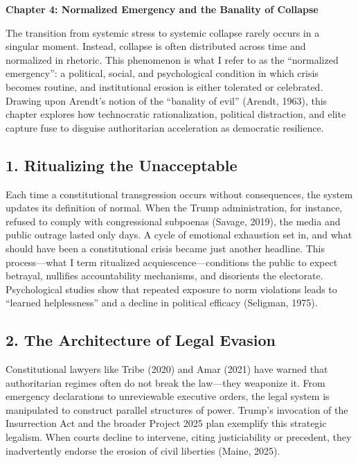 \documentclass[
]{article}
\author{}
\date{}
\begin{document}
\textbf{Chapter 4: Normalized Emergency and the Banality of Collapse}

The transition from systemic stress to systemic collapse rarely occurs in a singular moment. Instead, collapse is often distributed across time and normalized in rhetoric. This phenomenon is what I refer to as the ``normalized emergency'': a political, social, and psychological condition in which crisis becomes routine, and institutional erosion is either tolerated or celebrated. Drawing upon Arendt's notion of the ``banality of evil'' (Arendt, 1963), this chapter explores how technocratic rationalization, political distraction, and elite capture fuse to disguise authoritarian acceleration as democratic resilience.

\subsection{1. Ritualizing the Unacceptable}\label{ritualizing-the-unacceptable}

Each time a constitutional transgression occurs without consequences, the system updates its definition of normal. When the Trump administration, for instance, refused to comply with congressional subpoenas (Savage, 2019), the media and public outrage lasted only days. A cycle of emotional exhaustion set in, and what should have been a constitutional crisis became just another headline. This process---what I term ritualized acquiescence---conditions the public to expect betrayal, nullifies accountability mechanisms, and disorients the electorate. Psychological studies show that repeated exposure to norm violations leads to ``learned helplessness'' and a decline in political efficacy (Seligman, 1975).

\subsection{2. The Architecture of Legal Evasion}\label{the-architecture-of-legal-evasion}

Constitutional lawyers like Tribe (2020) and Amar (2021) have warned that authoritarian regimes often do not break the law---they weaponize it. From emergency declarations to unreviewable executive orders, the legal system is manipulated to construct parallel structures of power. Trump's invocation of the Insurrection Act and the broader Project 2025 plan exemplify this strategic legalism. When courts decline to intervene, citing justiciability or precedent, they inadvertently endorse the erosion of civil liberties (Maine, 2025).
\end{document}
